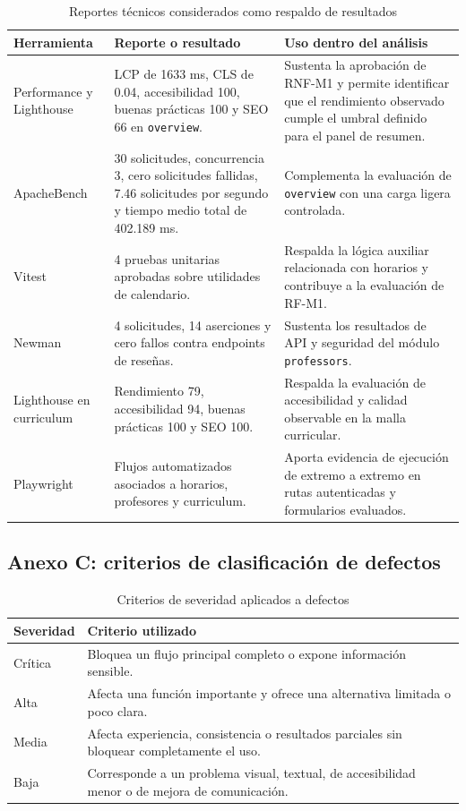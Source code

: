 \documentclass[11pt,spanish]{article}
\begin{document}
\begin{table}[H]
\centering
\caption{Reportes técnicos considerados como respaldo de resultados}
\label{tab:anexo-reportes}
\begin{tabularx}{\textwidth}{p{3.8cm} p{4.2cm} Y}
\toprule
\textbf{Herramienta} & \textbf{Reporte o resultado} & \textbf{Uso dentro del análisis} \\
\midrule
Performance y Lighthouse & LCP de 1633 ms, CLS de 0.04, accesibilidad 100, buenas prácticas 100 y SEO 66 en \texttt{overview}. & Sustenta la aprobación de RNF-M1 y permite identificar que el rendimiento observado cumple el umbral definido para el panel de resumen. \\
ApacheBench & 30 solicitudes, concurrencia 3, cero solicitudes fallidas, 7.46 solicitudes por segundo y tiempo medio total de 402.189 ms. & Complementa la evaluación de \texttt{overview} con una carga ligera controlada. \\
Vitest & 4 pruebas unitarias aprobadas sobre utilidades de calendario. & Respalda la lógica auxiliar relacionada con horarios y contribuye a la evaluación de RF-M1. \\
Newman & 4 solicitudes, 14 aserciones y cero fallos contra endpoints de reseñas. & Sustenta los resultados de API y seguridad del módulo \texttt{professors}. \\
Lighthouse en curriculum & Rendimiento 79, accesibilidad 94, buenas prácticas 100 y SEO 100. & Respalda la evaluación de accesibilidad y calidad observable en la malla curricular. \\
Playwright & Flujos automatizados asociados a horarios, profesores y curriculum. & Aporta evidencia de ejecución de extremo a extremo en rutas autenticadas y formularios evaluados. \\
\bottomrule
\end{tabularx}
\end{table}

\subsection{Anexo C: criterios de clasificación de defectos}

\begin{table}[H]
\centering
\caption{Criterios de severidad aplicados a defectos}
\label{tab:anexo-severidad}
\begin{tabularx}{\textwidth}{p{3cm} Y}
\toprule
\textbf{Severidad} & \textbf{Criterio utilizado} \\
\midrule
Crítica & Bloquea un flujo principal completo o expone información sensible. \\
Alta & Afecta una función importante y ofrece una alternativa limitada o poco clara. \\
Media & Afecta experiencia, consistencia o resultados parciales sin bloquear completamente el uso. \\
Baja & Corresponde a un problema visual, textual, de accesibilidad menor o de mejora de comunicación. \\
\bottomrule
\end{tabularx}
\end{table}
\end{document}
